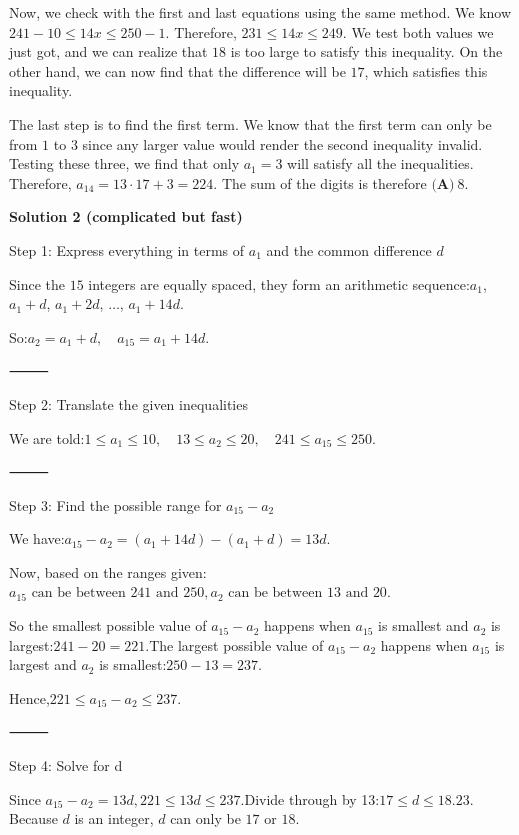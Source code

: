 \begin{enumerate}
 Now, we check with the first and last equations using the same method. We know $241-10\leq 14x\leq250-1$. Therefore, $231\leq 14x\leq249$. We test both values we just got, and we can realize that $18$ is too large to satisfy this inequality. On the other hand, we can now find that the difference will be $17$, which satisfies this inequality.

 The last step is to find the first term. We know that the first term can only be from $1$ to $3$ since any larger value would render the second inequality invalid. Testing these three, we find that only $a_1=3$ will satisfy all the inequalities. Therefore, $a_{14}=13\cdot17+3=224$. The sum of the digits is therefore $\boxed{\textbf{(A)}\ 8}$.

 



\textbf{Solution 2 (complicated but fast)}

Step 1: Express everything in terms of $a_1$ and the common difference $d$

 
Since the $15$ integers are equally spaced, they form an arithmetic sequence:$a_1$, $a_1 + d$, $a_1 + 2d$, $\dots$, $a_1 + 14d.$

 So:$a_2 = a_1 + d, \quad a_{15} = a_1 + 14d.$

 ⸻

 Step 2: Translate the given inequalities

 We are told:$1 \le a_1 \le 10, \quad 13 \le a_2 \le 20, \quad 241 \le a_{15} \le 250$.

 ⸻

 Step 3: Find the possible range for $a_{15} - a_2$

 We have:$a_{15} - a_2 = (a_1 + 14d) - (a_1 + d) = 13d.$

 Now, based on the ranges given:$a_{15} \text{ can be between } 241 \text{ and } 250, a_2 \text{ can be between } 13 \text{ and } 20.$

 So the smallest possible value of $a_{15} - a_2$ happens when $a_{15}$ is smallest and $a_2$ is largest:$241 - 20 = 221.$The largest possible value of $a_{15} - a_2$ happens when $a_{15}$ is largest and $a_2$ is smallest:$250 - 13 = 237.$

 Hence,$221 \le a_{15} - a_2 \le 237.$

 ⸻

 Step 4: Solve for d

 Since $a_{15} - a_2 = 13d, 221 \le 13d \le 237.$Divide through by 13:$17 \le d \le 18.23.$Because $d$ is an integer, $d$ can only be $17$ or $18$.


\end{enumerate}
